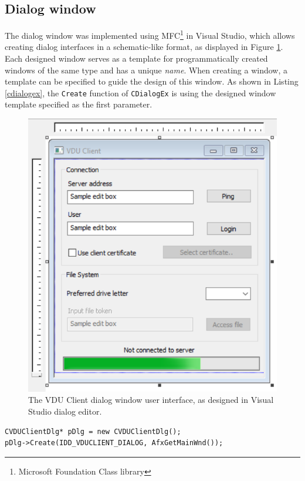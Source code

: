 \subsection{Dialog window}
The dialog window was implemented using MFC\footnote{Microsoft Foundation Class library} in Visual Studio, which allows creating dialog interfaces in a schematic-like format, as displayed in Figure \ref{dialogeditorui}. Each designed window serves as a template for programmatically created windows of the same type and has a unique \textit{name}. When creating a window, a template can be specified to guide the design of this window. As shown in Listing \ref{cdialogex}, the \lstinline{Create} function of \lstinline{CDialogEx} is using the designed window template specified as the first parameter.
\begin{figure}[htb]
    \centering
	\includegraphics[]{obrazky-figures/resourceeditorui.pdf}
	\caption{The VDU Client dialog window user interface, as designed in Visual Studio dialog editor.}
	\label{dialogeditorui}
\end{figure}
\begin{lstlisting}[caption={Creating the extended dialog window of VDU Client}, label=cdialogex]
CVDUClientDlg* pDlg = new CVDUClientDlg();
pDlg->Create(IDD_VDUCLIENT_DIALOG, AfxGetMainWnd());
\end{lstlisting}
